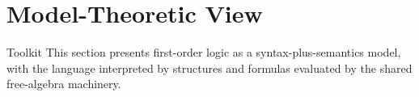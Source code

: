 \section{Model-Theoretic View}

\begin{toolkitbox}{Toolkit}
This section presents first-order logic as a syntax-plus-semantics model, with
the language interpreted by structures and formulas evaluated by the shared
free-algebra machinery.
\end{toolkitbox}





